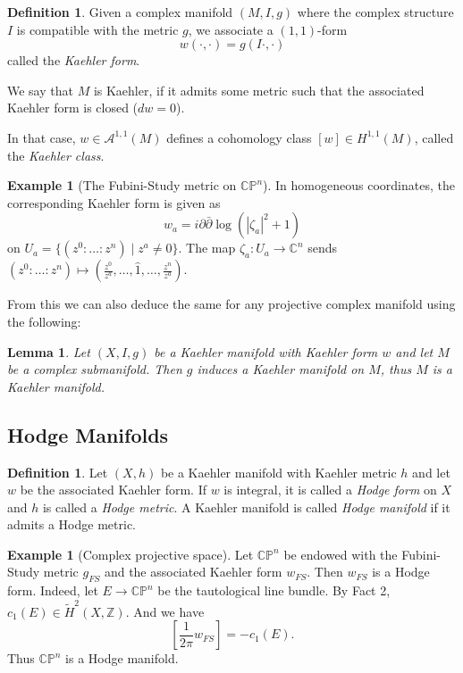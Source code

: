 \documentclass[11pt,A4]{article}
\theoremstyle{plain}
\newtheorem{lm}[thm]{Lemma}
\theoremstyle{definition}
\newtheorem{defn}[thm]{Definition}
\newtheorem{exa}[thm]{Example}
\theoremstyle{remark}
\newcommand{\Z}{\mathbb{Z}}
\newcommand{\1}{\mathbbm{1}}
\newcommand{\C}{\mathbb{C}}
\newcommand{\CP}{\mathbb{CP}}
\newcommand{\A}{\mathscr{A}}
\begin{document}
\begin{defn}
    Given a complex manifold $(M,I,g)$ where the complex structure $I$ is compatible with the metric $g$, we associate a $(1,1)$-form
    \[ w(\cdot,\cdot)=g(I\cdot,\cdot) \]
    called the \textit{Kaehler form}.

    We say that $M$ is Kaehler, if it admits some metric such that the associated Kaehler form is closed ($dw=0$).

    In that case, $w\in \A^{1,1}(M)$ defines a cohomology class $[w]\in H^{1,1}(M)$, called the \textit{Kaehler class}.
\end{defn}

\begin{exa}[The Fubini-Study metric on $\CP^{n}$]
    In homogeneous coordinates, the corresponding Kaehler form is given as
    \[ w_{a}=i\partial \bar{\partial}\log(|\zeta_{a}|^{2}+1) \]
    on $U_{a}=\{(z^{0}:\ldots:z^{n})\mid z^{a}\neq 0\}$.
    The map $\zeta_{a}\colon U_{a}\to \C^{n}$ sends $(z^{0}:\ldots:z^{n})\mapsto (\frac{z^{0}}{z^{a}},\ldots,\hat{1},\ldots,\frac{z^{n}}{z^{a}})$.
\end{exa}

From this we can also deduce the same for any projective complex manifold using the following:

\begin{lm}
    Let $(X,I,g)$ be a Kaehler manifold with Kaehler form $w$ and let $M$ be a complex submanifold.
    Then $g$ induces a Kaehler manifold on $M$, thus $M$ is a Kaehler manifold.
\end{lm}

\subsection{Hodge Manifolds}

\begin{defn}
    Let $(X,h)$ be a Kaehler manifold with Kaehler metric $h$ and let $w$ be the associated Kaehler form.
    If $w$ is integral, it is called a \textit{Hodge form} on $X$ and $h$ is called a \textit{Hodge metric}.
    A Kaehler manifold is called \textit{Hodge manifold} if it admits a Hodge metric.
\end{defn}

\begin{exa}[Complex projective space]
    Let $\CP^{n}$ be endowed with the Fubini-Study metric $g_{FS}$ and the associated Kaehler form $w_{FS}$.
    Then $w_{FS}$ is a Hodge form.
    Indeed, let $E\to \CP^{n}$ be the tautological line bundle.
    By Fact 2, $c_{1}(E)\in \tilde{H}^{2}(X,\Z)$.
    And we have
    \[ \left[\frac{1}{2\pi} w_{FS}\right] =-c_{1}(E).\]
    Thus $\CP^{n}$ is a Hodge manifold.
\end{exa}
\end{document}
